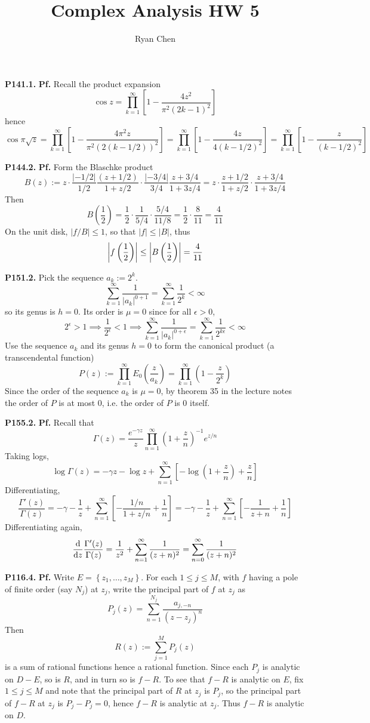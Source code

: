 \documentclass{article}
\title{Complex Analysis HW 5}
\author{Ryan Chen}
\def\tbf#1{\textbf{#1}}
\newcommand{\br}[1]{\left(#1\right)}
\newcommand{\sbr}[1]{\left[#1\right]}
\newcommand{\brc}[1]{\left\{#1\right\}}
\newcommand{\ep}{\epsilon}
\newcommand{\inv}{^{-1}}
\newcommand{\pf}{\tbf{Pf. }}
\newcommand{\imp}{\implies}
\newcommand{\sep}[1][.5cm]{\vspace{#1}}
\begin{document}
	
\maketitle



\tbf{P141.1.} \pf Recall the product expansion
$$\cos z = \prod_{k=1}^\infty\sbr{1-\frac{4z^2}{\pi^2(2k-1)^2}}$$
hence
$$\cos \pi\sqrt z = \prod_{k=1}^\infty\sbr{1-\frac{4\pi^2z}{\pi^2(2(k-1/2))^2}}
= \prod_{k=1}^\infty\sbr{1-\frac{4z}{4(k-1/2)^2}}
= \prod_{k=1}^\infty\sbr{1-\frac{z}{(k-1/2)^2}}$$
\sep



\tbf{P144.2.} \pf Form the Blaschke product
$$B(z) := z \cdot \frac{|-1/2|}{1/2}\frac{(z+1/2)}{1+z/2} \cdot \frac{|-3/4|}{3/4}\frac{z+3/4}{1+3z/4}
= z \cdot \frac{z+1/2}{1+z/2} \cdot \frac{z+3/4}{1+3z/4}$$
Then
$$B\br{\frac12} = \frac12 \cdot \frac{1}{5/4} \cdot \frac{5/4}{11/8}
= \frac12 \cdot \frac{8}{11}
= \frac{4}{11}$$
On the unit disk, $|f/B|\le 1$, so that $|f|\le |B|$, thus
$$\abs{f\br{\frac12}} \le \abs{B\br{\frac12}} = \frac{4}{11}$$
\sep



\tbf{P151.2.} Pick the sequence $a_k:=2^k$.
$$\sum_{k=1}^\infty\frac{1}{|a_k|^{0+1}} = \sum_{k=1}^\infty\frac{1}{2^k} < \infty$$
so its genus is $h=0$. Its order is $\mu=0$ since for all $\ep>0$,
$$2^\ep > 1
\imp \frac{1}{2^\ep} < 1
\imp \sum_{k=1}^\infty\frac{1}{|a_k|^{0+\ep}}
= \sum_{k=1}^\infty\frac{1}{2^{k\ep}}
< \infty$$
Use the sequence $a_k$ and its genus $h=0$ to form the canonical product (a transcendental function)
$$P(z) := \prod_{k=1}^\infty E_0\br{\frac{z}{a_k}}
= \prod_{k=1}^\infty\br{1-\frac{z}{2^k}}$$
Since the order of the sequence $a_k$ is $\mu=0$, by theorem 35 in the lecture notes the order of $P$ is at most 0, i.e. the order of $P$ is 0 itself.
\sep



\tbf{P155.2.} \pf Recall that
$$\Gamma(z) = \frac{e^{-\gamma z}}{z}\prod_{n=1}^\infty\br{1+\frac zn}\inv e^{z/n}$$
Taking logs,
$$\log\Gamma(z) = -\gamma z - \log z + \sum_{n=1}^\infty\sbr{-\log(1+\frac zn)+\frac zn}$$
Differentiating,
$$\frac{\Gamma'(z)}{\Gamma(z)} = -\gamma - \frac1z + \sum_{n=1}^\infty\sbr{-\frac{1/n}{1+z/n}+\frac1n}
= -\gamma - \frac1z + \sum_{n=1}^\infty\sbr{-\frac{1}{z+n}+\frac1n}$$
Differentiating again,
$$\dv{z}\frac{\Gamma'(z)}{\Gamma(z)} = \frac{1}{z^2} + \sum_{n=1}^\infty\frac{1}{(z+n)^2}
= \sum_{n=0}^\infty\frac{1}{(z+n)^2}$$


\tbf{P116.4.} \pf Write $E=\brc{z_1,\dots,z_M}$. For each $1\le j\le M$, with $f$ having a pole of finite order (say $N_j$) at $z_j$, write the principal part of $f$ at $z_j$ as
$$P_j(z) = \sum_{n=1}^{N_j}\frac{a_{j,-n}}{(z-z_j)^n}$$
Then
$$R(z) := \sum_{j=1}^MP_j(z)$$
is a sum of rational functions hence a rational function. Since each $P_j$ is analytic on $D-E$, so is $R$, and in turn so is $f-R$. To see that $f-R$ is analytic on $E$, fix $1\le j\le M$ and note that the principal part of $R$ at $z_j$ is $P_j$, so the principal part of $f-R$ at $z_j$ is $P_j-P_j=0$, hence $f-R$ is analytic at $z_j$. Thus $f-R$ is analytic on $D$.

	
\end{document}
